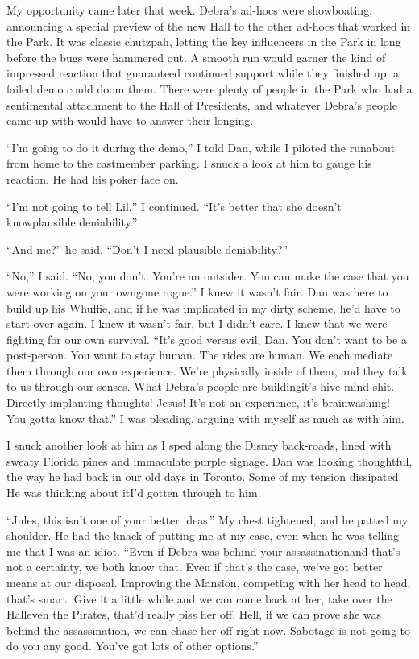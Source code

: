 My opportunity came later that week. Debra's ad-hocs were
showboating, announcing a special preview of the new Hall to the
other ad-hocs that worked in the Park. It was classic chutzpah,
letting the key influencers in the Park in long before the bugs
were hammered out. A smooth run would garner the kind of impressed
reaction that guaranteed continued support while they finished up;
a failed demo could doom them. There were plenty of people in the
Park who had a sentimental attachment to the Hall of Presidents,
and whatever Debra's people came up with would have to answer their
longing.

“I'm going to do it during the demo,” I told Dan, while I piloted
the runabout from home to the castmember parking. I snuck a look at
him to gauge his reaction. He had his poker face on.

“I'm not going to tell Lil,” I continued. “It's better that she
doesn't know{\dash}plausible deniability.”

“And me?” he said. “Don't I need plausible deniability?”

“No,” I said. “No, you don't. You're an outsider. You can make the
case that you were working on your own{\dash}gone rogue.” I knew it
wasn't fair. Dan was here to build up his Whuffie, and if he was
implicated in my dirty scheme, he'd have to start over again. I
knew it wasn't fair, but I didn't care. I knew that we were
fighting for our own survival. “It's good versus evil, Dan. You
don't want to be a post-person. You want to stay human. The rides
are human. We each mediate them through our own experience. We're
physically inside of them, and they talk to us through our senses.
What Debra's people are building{\dash}it's hive-mind shit. Directly
implanting thoughts! Jesus! It's not an experience, it's
brainwashing! You gotta know that.” I was pleading, arguing with
myself as much as with him.

I snuck another look at him as I sped along the Disney back-roads,
lined with sweaty Florida pines and immaculate purple signage. Dan
was looking thoughtful, the way he had back in our old days in
Toronto. Some of my tension dissipated. He was thinking about
it{\dash}I'd gotten through to him.

“Jules, this isn't one of your better ideas.” My chest tightened,
and he patted my shoulder. He had the knack of putting me at my
ease, even when he was telling me that I was an idiot. “Even if
Debra was behind your assassination{\dash}and that's not a certainty, we
both know that. Even if that's the case, we've got better means at
our disposal. Improving the Mansion, competing with her head to
head, that's smart. Give it a little while and we can come back at
her, take over the Hall{\dash}even the Pirates, that'd really piss her
off. Hell, if we can prove she was behind the assassination, we can
chase her off right now. Sabotage is not going to do you any good.
You've got lots of other options.”

